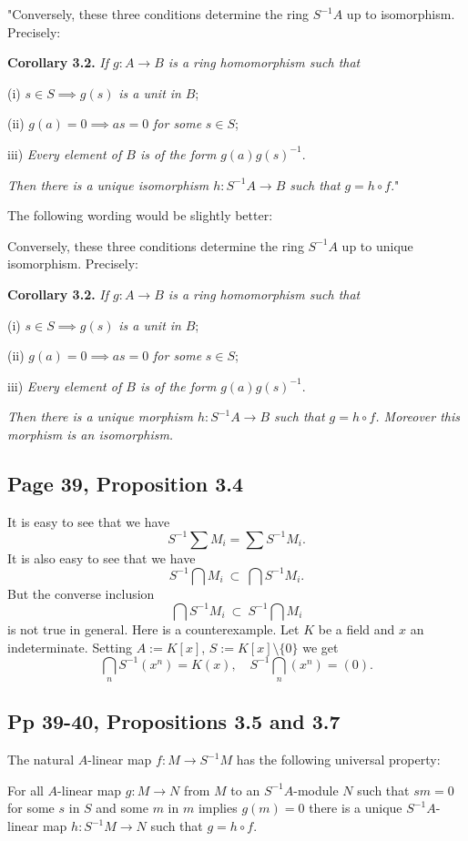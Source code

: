 \documentclass[parskip=half,fontsize=12pt]{scrartcl}%
\begin{document}
"Conversely, these three conditions determine the ring $S^{-1}A$ up to isomorphism. Precisely:

\textbf{Corollary 3.2.} \emph{If $g:A\to B$ is a ring homomorphism such that}

(i) $s\in S\implies g(s)$ \emph{is a unit in} $B$;

(ii) $g(a)=0\implies as=0$ \emph{for some} $s\in S$;

iii) \emph{Every element of $B$ is of the form} $g(a)g(s)^{-1}$.

\emph{Then there is a unique isomorphism $h:S^{-1}A\to B$ such that} $g=h\circ f$."

The following wording would be slightly better:

Conversely, these three conditions determine the ring $S^{-1}A$ up to unique isomorphism. Precisely:

\textbf{Corollary 3.2.} \emph{If $g:A\to B$ is a ring homomorphism such that}

(i) $s\in S\implies g(s)$ \emph{is a unit in} $B$;

(ii) $g(a)=0\implies as=0$ \emph{for some} $s\in S$;

iii) \emph{Every element of $B$ is of the form} $g(a)g(s)^{-1}$.

\emph{Then there is a unique morphism $h:S^{-1}A\to B$ such that $g=h\circ f$. Moreover this morphism is an isomorphism.}

\subsection{Page 39, Proposition 3.4}%

It is easy to see that we have 
$$
S^{-1}\sum M_i=\sum S^{-1}M_i.
$$ 
It is also easy to see that we have 
$$
S^{-1}\bigcap M_i\ \subset\ \bigcap S^{-1}M_i.
$$ 
But the converse inclusion 
$$
\bigcap S^{-1}M_i\ \subset\ S^{-1}\bigcap M_i
$$ 
is not true in general. Here is a counterexample. Let $K$ be a field and $x$ an indeterminate. Setting $A:=K[x]$, $S:=K[x]\setminus\{0\}$ we get 
$$
\bigcap_n S^{-1}(x^n)=K(x),\quad S^{-1}\bigcap_n(x^n)=(0).
$$

\subsection{Pp 39-40, Propositions 3.5 and 3.7}%

The natural $A$-linear map $f:M\to S^{-1}M$ has the following universal property:

For all $A$-linear map $g:M\to N$ from $M$ to an $S^{-1}A$-module $N$ such that $sm=0$ for some $s$ in $S$ and some $m$ in $m$ implies $g(m)=0$ there is a unique $S^{-1}A$-linear map $h:S^{-1}M\to N$ such that $g=h\circ f$.
\end{document}
